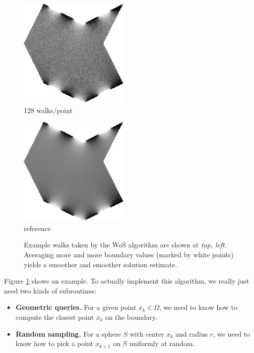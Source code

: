 \documentclass{article}
\newcommand{\figlabel}[1]{\textsf{#1}}
\newcommand{\figloc}[1]{\textit{#1}}
\renewcommand{\vec}[1]{#1}
\begin{document}
\begin{figure}[h!]
   \begin{minipage}{150pt}
      \centering
      \includegraphics[width=150pt]{images/WoSt-128wpp.png} \\
      \figlabel{128 walks/point}
   \end{minipage}
   \begin{minipage}{150pt}
      \centering
      \includegraphics[width=150pt]{images/WoSt-65536wpp.png} \\
      \figlabel{reference}
   \end{minipage}
   \caption{Example walks taken by the WoS algorithm are shown at \figloc{top, left}.  Averaging more and more boundary values (marked by white points) yields a smoother and smoother solution estimate.\label{fig:WoSExample}}
\end{figure}

Figure \ref{fig:WoSExample} shows an example.  To actually implement this algorithm, we really just need two kinds of subroutines:
\begin{itemize}
   \item \textbf{Geometric queries.}  For a given point \(\vec{x}_k \in \Omega\), we need to know how to compute the closest point \(\overline{\vec{x}}_k\) on the boundary.
   \item \textbf{Random sampling.} For a sphere \(S\) with center \(\vec{x}_k\) and radius \(r\), we need to know how to pick a point \(\vec{x}_{k+1}\) on \(S\) uniformly at random.
\end{itemize}
\end{document}
